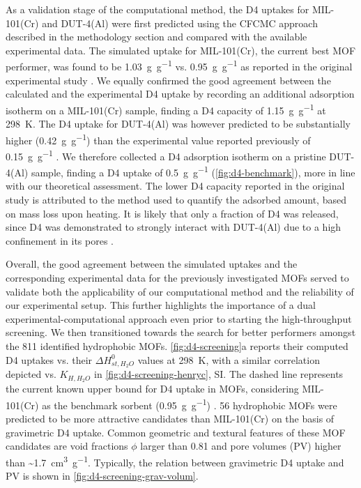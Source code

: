 As a validation stage of the computational method, the D4 uptakes for
MIL-101(Cr) and DUT-4(Al) were first predicted using the CFCMC approach described in
the methodology section and compared with the available experimental data. The
simulated uptake for MIL-101(Cr), the current best MOF performer, was found to
be \SI{1.03}{\gram\per\gram} vs. \SI{0.95}{\gram\per\gram} as reported in the
original experimental study \citep{gargiuloChromiumbasedMIL101Metal2019}. We
equally confirmed the good agreement between the calculated and the experimental
D4 uptake by recording an additional adsorption isotherm on a MIL-101(Cr)
sample, finding a D4 capacity of \SI{1.15}{\gram\per\gram} at \SI{298}{\kelvin}.
The D4 uptake for DUT-4(Al) was however predicted to be substantially higher
(\SI{0.42}{\gram\per\gram}) than the experimental value reported previously of
\SI{0.15}{\gram\per\gram} \citep{mito-okaSiloxaneD4Capture2013}. We therefore
collected a D4 adsorption isotherm on a pristine DUT-4(Al) sample, finding a D4
uptake of \SI{0.5}{\gram\per\gram} (\cref{fig:d4-benchmark}), more in line with
our theoretical assessment. The lower D4 capacity reported in the original study
is attributed to the method used to quantify the adsorbed amount, based on mass
loss upon heating. It is likely that only a fraction of D4 was released, since
D4 was demonstrated to strongly interact with DUT-4(Al) due to a high confinement in
its pores \citep{mito-okaSiloxaneD4Capture2013}.

Overall, the good agreement between the simulated uptakes and the corresponding
experimental data for the previously investigated MOFs served to validate both
the applicability of our computational method and the reliability of our
experimental setup. This further highlights the importance of a dual
experimental-computational approach even prior to starting the high-throughput
screening. We then transitioned towards the search for better performers amongst
the 811 identified hydrophobic MOFs. \cref{fig:d4-screening}a reports their
computed D4 uptakes vs. their \(\Delta H_{st,H_{2}O}^{0}\) values at
\SI{298}{\kelvin}, with a similar correlation depicted vs. \(K_{H,H_{2}O}\) in
\cref{fig:d4-screening-henryc}, SI. The dashed line represents the current known
upper bound for D4 uptake in MOFs, considering MIL-101(Cr) as the benchmark
sorbent (\SI{0.95}{\gram\per\gram})
\citep{gargiuloChromiumbasedMIL101Metal2019}. 56 hydrophobic MOFs were predicted
to be more attractive candidates than MIL-101(Cr) on the basis of gravimetric D4
uptake. Common geometric and textural features of these MOF candidates are void
fractions \(\phi\) larger than 0.81 and pore volumes (PV) higher than
\textasciitilde \SI{1.7}{\centi\metre\cubed\per\gram}. Typically, the relation
between gravimetric D4 uptake and PV is shown in
\cref{fig:d4-screening-grav-volum}.

